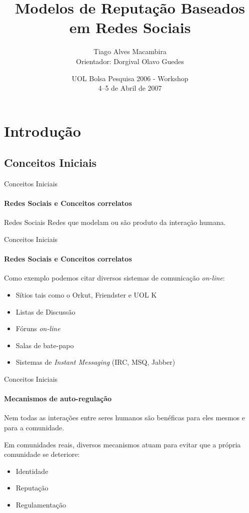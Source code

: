 \documentclass[compress]{beamer}
\title[Modelos de Reputação]{Modelos de Reputação Baseados em Redes Sociais}
\author[Tiago Macambira]{Tiago Alves Macambira \\ Orientador: Dorgival
Olavo Guedes}
\institute{e-Speed \\ Departamento de Ciência da Computação \\ Universidade Federal de Minas Gerais}
\date{
UOL Bolsa Pesquisa 2006 - Workshop \\
4--5 de Abril de 2007}
\begin{document}
\frame{ \titlepage }


\section{Introdução}
\subsection{Conceitos Iniciais}

    \begin{frame}{Conceitos Iniciais}
    \framesubtitle{Redes Sociais e Conceitos correlatos}
	\begin{block}{Redes Sociais}
	    Redes que modelam ou são produto da \alert{interação} humana.
	\end{block}
    \end{frame}

    \begin{frame}{Conceitos Iniciais}
    \framesubtitle{Redes Sociais e Conceitos correlatos}
	Como exemplo podemos citar diversos sistemas de comunicação
	\emph{on-line}:
	\begin{itemize}
	    \item Sítios tais como o Orkut, Friendster e UOL K
	    \item Listas de Discussão
	    \item Fóruns \emph{on-line}
	    \item Salas de bate-papo
	    \item Sistemas de \emph{Instant Messaging} (IRC, MSQ, Jabber)
	\end{itemize}
	
    \end{frame}

    \begin{frame}{Conceitos Iniciais}
    \framesubtitle{Mecanismos de auto-regulação}
	Nem todas as \alert{interações} entre seres humanos são benéficas para
	eles mesmos e para a comunidade.
        \pause

	Em comunidades reais, diversos mecanismos atuam
	para evitar que a própria comunidade se deteriore:
	\begin{itemize}[<alert@+|+->]
	    \item Identidade
	    \item Reputação
	    \item Regulamentação
	\end{itemize}
    \end{frame}
\end{document}
